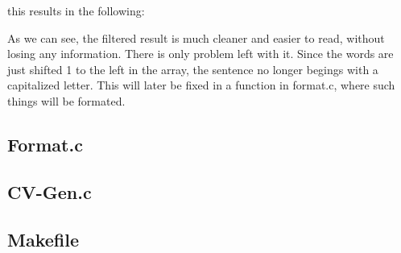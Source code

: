 this results in the following:

As we can see, the filtered result is much cleaner and easier to read, without losing any information.
There is only problem left with it. Since the words are just shifted 1 to the left in the array, the sentence no longer begings
with a capitalized letter. This will later be fixed in a function in format.c, where such things will be formated.

\subsubsection{}
\subsection{Format.c}
\subsection{CV-Gen.c}
\subsection{Makefile}